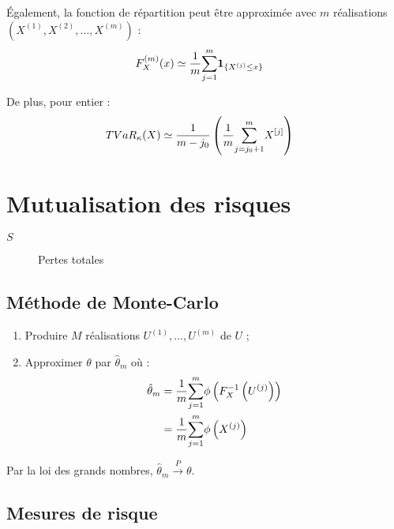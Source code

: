 \documentclass[10pt, french]{article}
\begin{document}
\begin{multicols*}{2}
Également, la fonction de répartition peut être approximée avec $m$ réalisations $\left( X^{(1)}, X^{(2)}, \dots, X^{(m)} \right)$ :
\begin{align*}
	F^{(m)}_{X}(x)
	&\simeq	\frac{1}{m} \overset{m}{\underset{j	=	1}{\sum}} \bm{1}_{\{X^{(j)}	\leq	x\}}
\end{align*}

De plus, pour  entier :
\begin{align*}
	TVaR_{\kappa}(X)
	&\simeq	\frac{1}{m - j_{0}} \left( \frac{1}{m} \overset{m}{\underset{j	=	j_{0} + 1}{\sum}} X^{[j]} 
	\right)
\end{align*}

\pagebreak
\section{Mutualisation des risques}
\begin{distributions}[Terminologie]
\begin{description}
	\item[$S$]	Pertes totales 
\end{description}
\end{distributions}

\subsection{Méthode de Monte-Carlo}
\begin{algo2}
\begin{enumerate}
	\item	Produire $M$ réalisations $U^{(1)}, \dots, U^{(m)}$ de $U$ ;
	\item	Approximer $\theta$ par $\hat{\theta}_{m}$ où :
		\begin{align*}
		\hat{\theta}_{m}
		&=	\frac{1}{m} \overset{m}{\underset{j = 1}{\sum}} \phi\left( F_{X}^{-1}\left(U^{(j)}\right) \right)	\\
		&=	\frac{1}{m} \overset{m}{\underset{j = 1}{\sum}} \phi\left( X^{(j)} \right)	\\
		\end{align*}
\end{enumerate}
Par la loi des grands nombres, $\hat{\theta}_{m}	\overset{P}{\rightarrow}	\theta$.
\end{algo2}


\subsection{Mesures de risque}



\end{multicols*}
\end{document}
